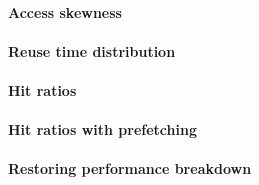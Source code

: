 \paragraph{Access skewness}

\paragraph{Reuse time distribution}

\paragraph{Hit ratios}

\paragraph{Hit ratios with prefetching}


\paragraph{Restoring performance breakdown}